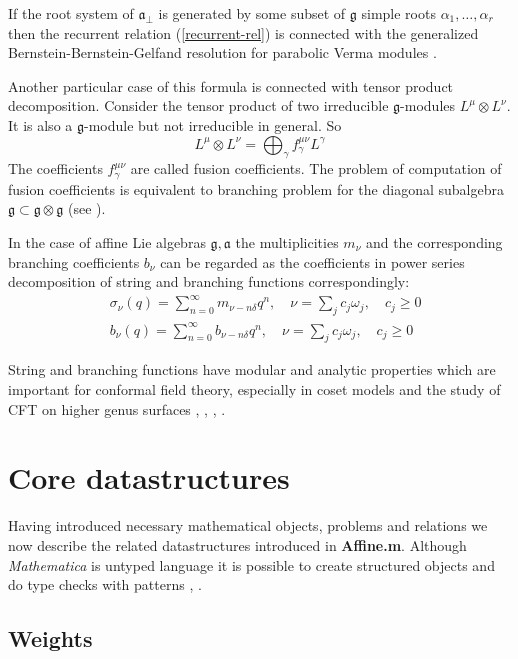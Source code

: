 \documentclass[preprint,12pt]{elsarticle}
\newcommand{\gf}{\mathfrak{g}}
\newcommand{\af}{\mathfrak{a}}
\newcommand{\afb}{\mathfrak{a}_{\bot}}
\begin{document}
If the root system of $\afb$ is generated by some subset of $\gf$
simple roots $\alpha_{1},\dots,\alpha_{r}$ then the recurrent
relation (\ref{recurrent-rel}) is connected with the generalized
Bernstein-Bernstein-Gelfand resolution for parabolic Verma modules
\cite{2011arXiv1102.1702L}.

Another particular case of this formula is connected with tensor
product decomposition. Consider the tensor product of two
irreducible $\gf$-modules $L^{\mu}\otimes L^{\nu}$. It is also a
$\gf$-module but not irreducible in general. So
\begin{equation}
  \label{eq:19}
  L^{\mu}\otimes L^{\nu}=\bigoplus_{\gamma} f^{\mu\nu}_{\gamma}L^{\gamma}
\end{equation}
The coefficients $f^{\mu\nu}_{\gamma}$ are called fusion
coefficients. The problem of computation of fusion coefficients is
equivalent to branching problem for the diagonal subalgebra
$\gf\subset \gf\otimes \gf$ (see \cite{LyakhovskyPostnova2011}).

In the case of affine Lie algebras $\gf, \af$  the multiplicities
$m_{\nu}$ and the corresponding branching coefficients $b_{\nu}$
can be regarded as the coefficients in power series decomposition
of string and branching functions correspondingly:
\begin{align}
  \label{eq:21}
  &\sigma_{\nu}(q)=\sum_{n=0}^{\infty} m_{\nu-n\delta} q^n, \quad \nu=\sum_j c_j \omega_j,\quad c_j\geq 0\\
  & b_{\nu}(q)=\sum_{n=0}^{\infty} b_{\nu-n\delta} q^n,\quad  \nu=\sum_j c_j \omega_j, \quad c_j\geq 0
\end{align}

String and branching functions have  modular and analytic properties which are important for conformal field theory, especially in  coset models and the study of CFT on higher genus surfaces \cite{kac1988modular}, \cite{difrancesco1997cft}, \cite{Walton:1999xc}, \cite{walton1989conformal}.

\section{Core datastructures}
\label{sec:core-datastructures} Having introduced necessary
mathematical objects, problems and relations we now describe the
related datastructures introduced in {\bf Affine.m}. Although {\it
Mathematica} is untyped language it is possible to create
structured objects and do type checks with patterns
\cite{shifrinmathematica}, \cite{maeder2000computer}.
\subsection{Weights}
\label{sec:weights}
\end{document}
